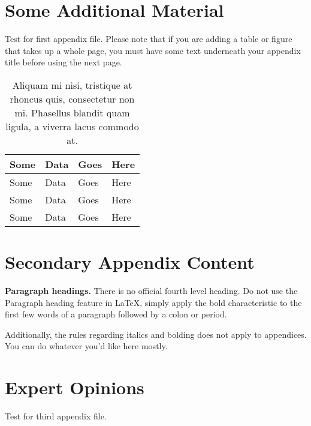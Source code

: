 \chapter{Some Additional Material}

Test for first appendix file. Please note that if you are adding a table or figure that takes up a whole page, you must have some text underneath your appendix title before using the next page.

\begin{table}[h]
\caption[Aliquam mi nisi]{Aliquam mi nisi, tristique at rhoncus quis, consectetur non mi. Phasellus blandit quam ligula, a viverra lacus commodo at.}
\begin{tabularx}{\textwidth}{XXXX}\hline
Some    & Data  & Goes  & Here\\\hline
Some    & Data  & Goes  & Here\\
Some    & Data  & Goes  & Here\\
Some    & Data  & Goes  & Here\\\hline
\end{tabularx}

\end{table}


\chapter{Secondary Appendix Content}

{\bf Paragraph headings.} There is no official fourth level heading. Do not use the Paragraph heading feature in LaTeX, simply apply the bold characteristic to the first few words of a paragraph followed by a colon or period.

Additionally, the rules regarding italics and bolding does not apply to appendices. You can do whatever you'd like here mostly.


\chapter{Expert Opinions}

Test for third appendix file.


